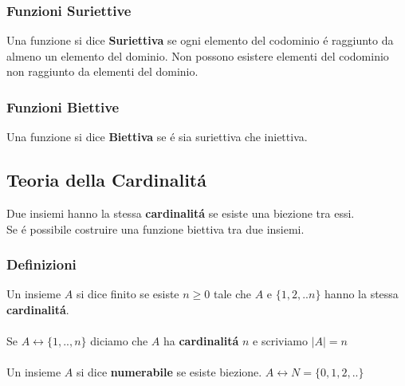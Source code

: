 \documentclass[11pt]{article}
\begin{document}
        \subsubsection{Funzioni Suriettive}
            Una funzione si dice \textbf{Suriettiva} se ogni elemento del codominio \'e raggiunto da almeno un elemento del dominio. Non possono esistere elementi del codominio non raggiunto da elementi del dominio.
        \subsubsection{Funzioni Biettive}
            Una funzione si dice \textbf{Biettiva} se \'e sia suriettiva che iniettiva.
    \subsection{Teoria della Cardinalit\'a}
        Due insiemi hanno la stessa \textbf{cardinalit\'a} se esiste una biezione tra essi.\\
        Se \'e possibile costruire una funzione biettiva tra due insiemi.
        \subsubsection{Definizioni}
            Un insieme $A$ si dice finito se esiste $n \geq 0$ tale che $A$ e $\{1,2,..n\}$ hanno la stessa \textbf{cardinalit\'a}.  \\
            \\
            Se $A \longleftrightarrow \{1,..,n\}$ diciamo che $A$ ha \textbf{cardinalit\'a} $n$ e scriviamo  
            $\mid A \mid  =  n $ 
            \\
            \\
            Un insieme $A$ si dice \textbf{numerabile} se esiste biezione. 
            $A \longleftrightarrow N = \{0,1,2,..\}$
\end{document}
